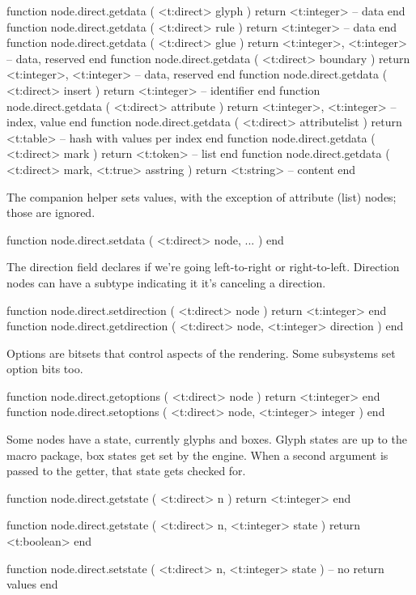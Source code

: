 \starttyping[option=LUA]
function node.direct.getdata ( <t:direct> glyph )
    return <t:integer>  -- data
end
function node.direct.getdata ( <t:direct> rule )
    return <t:integer> -- data
end
function node.direct.getdata ( <t:direct> glue )
    return <t:integer>, <t:integer> -- data, reserved
end
function node.direct.getdata ( <t:direct> boundary )
    return <t:integer>, <t:integer> -- data, reserved
end
function node.direct.getdata ( <t:direct> insert )
    return <t:integer> -- identifier
end
function node.direct.getdata ( <t:direct> attribute )
    return <t:integer>, <t:integer> -- index, value
end
function node.direct.getdata ( <t:direct> attributelist )
    return <t:table> -- hash with values per index
end
function node.direct.getdata ( <t:direct> mark )
    return <t:token> -- list
end
function node.direct.getdata ( <t:direct> mark, <t:true> asstring )
    return <t:string> -- content
end
\stoptyping

The companion helper sets values, with the exception of attribute (list) nodes;
those are ignored.

\starttyping[option=LUA]
function node.direct.setdata ( <t:direct> node, ... ) end
\stoptyping

The direction field declares if we're going left-to-right or right-to-left.
Direction nodes can have a subtype indicating it it's canceling a direction.

\starttyping[option=LUA]
function node.direct.setdirection ( <t:direct> node ) return <t:integer> end
function node.direct.getdirection ( <t:direct> node, <t:integer> direction ) end
\stoptyping

Options are bitsets that control aspects of the rendering. Some subsystems set
option bits too.

\starttyping[option=LUA]
function node.direct.getoptions ( <t:direct> node ) return <t:integer> end
function node.direct.setoptions ( <t:direct> node, <t:integer> integer ) end
\stoptyping

Some nodes have a state, currently glyphs and boxes. Glyph states are up to the
macro package, box states get set by the engine. When a second argument is passed
to the getter, that state gets checked for.

\starttyping[option=LUA]
function node.direct.getstate (
    <t:direct> n
)
    return <t:integer>
end

function node.direct.getstate (
    <t:direct> n,
    <t:integer> state
)
    return <t:boolean>
end

function node.direct.setstate (
    <t:direct>  n,
    <t:integer> state
)
    -- no return values
end
\stoptyping

